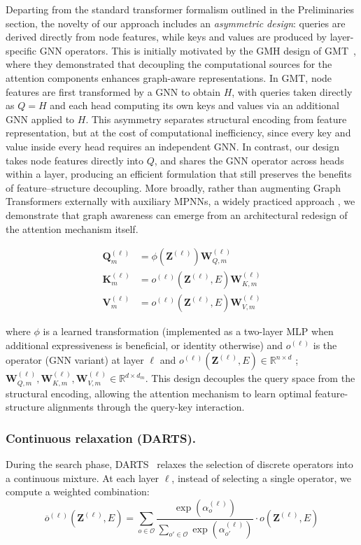 \documentclass[lettersize,journal]{IEEEtran}
\begin{document}
Departing from the standard transformer formalism outlined in the Preliminaries section, the novelty of our approach includes an \textit{asymmetric design}: queries are derived directly from node features, while keys and values are produced by layer-specific GNN operators. This is initially motivated by the GMH design of GMT~\cite{baek_accurate_2021}, where they demonstrated that decoupling the computational sources for the attention components enhances graph-aware representations. In GMT, node features are first transformed by a GNN to obtain $H$, with queries taken directly as $Q=H$ and each head computing its own keys and values via an additional GNN applied to $H$. This asymmetry separates structural encoding from feature representation, but at the cost of computational inefficiency, since every key and value inside every head requires an independent GNN. In contrast, our design takes node features directly into $Q$, and shares the GNN operator across heads within a layer, producing an efficient formulation that still preserves the benefits of feature–structure decoupling. More broadly, rather than augmenting Graph Transformers externally with auxiliary MPNNs, a widely practiced approach \cite{rampa_recipe_nodate,song_towards_2025}, we demonstrate that graph awareness can emerge from  an architectural redesign of the attention mechanism itself.

\begin{align}
\mathbf{Q}_m^{(\ell)} &= \phi(\mathbf{Z}^{(\ell)}) \mathbf{W}_{Q,m}^{(\ell)} \\
\mathbf{K}_m^{(\ell)} &= o^{(\ell)}(\mathbf{Z}^{(\ell)}, E) \mathbf{W}_{K,m}^{(\ell)} \\
\mathbf{V}_m^{(\ell)} &= o^{(\ell)}(\mathbf{Z}^{(\ell)}, E) \mathbf{W}_{V,m}^{(\ell)}
\end{align}

where $\phi$ is a learned transformation (implemented as a two-layer MLP when additional expressiveness is beneficial, or identity otherwise) and $o^{(\ell)}$ is the operator (GNN variant) at layer $\ell$ and $o^{(\ell)}(\mathbf{Z}^{(\ell)},E)\in\mathbb{R}^{n\times d}$ ; $\mathbf{W}_{Q,m}^{(\ell)},\mathbf{W}_{K,m}^{(\ell)},\mathbf{W}_{V,m}^{(\ell)}\in\mathbb{R}^{d\times d_m}$. This design decouples the query space from the structural encoding, allowing the attention mechanism to learn optimal feature-structure alignments through the query-key interaction.


\subsubsection{Continuous relaxation (DARTS).}
During the search phase, DARTS~\cite{liu_darts_2019} relaxes the selection of discrete operators into a continuous mixture. At each layer $\ell$, instead of selecting a single operator, we compute a weighted combination:
\begin{equation}
\overline{o}^{(\ell)}(\mathbf{Z}^{(\ell)}, E) = \sum_{o \in \mathcal{O}} \frac{\exp(\alpha_o^{(\ell)})}{\sum_{o' \in \mathcal{O}} \exp(\alpha_{o'}^{(\ell)})} \cdot o(\mathbf{Z}^{(\ell)}, E)
\end{equation}
\end{document}
